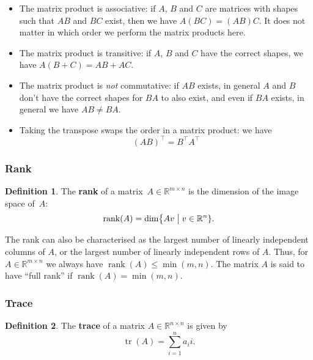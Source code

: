 \documentclass[
  a4paper,
]{article}
\theoremstyle{definition}
\newtheorem{definition}{Definition}[section]
\theoremstyle{definition}
\theoremstyle{definition}
\theoremstyle{definition}
\theoremstyle{remark}
\begin{document}
\begin{itemize}
\item
  The matrix product is associative: if \(A\), \(B\) and \(C\) are matrices
  with shapes such that \(AB\) and \(BC\) exist, then we have \(A(BC) = (AB)C\).
  It does not matter in which order we perform the matrix products here.
\item
  The matrix product is transitive: if \(A\), \(B\) and \(C\) have the
  correct shapes, we have \(A(B+C) = AB + AC\).
\item
  The matrix product is \emph{not} commutative: if \(AB\) exists, in general
  \(A\) and \(B\) don't have the correct shapes for \(BA\) to also exist,
  and even if \(BA\) exists, in general we have \(AB \neq BA\).
\item
  Taking the transpose swaps the order in a matrix product:
  we have
  \begin{equation}
    (AB)^\top = B^\top A^\top  \label{eq:AB-trans}
  \end{equation}
\end{itemize}

\hypertarget{rank}{%
\subsubsection{Rank}\label{rank}}

\begin{definition}
The \textbf{rank} of a matrix~\(A \in \mathbb{R}^{m \times n}\) is the dimension of the
image space of~\(A\):
\begin{equation*}
  \mathop{\mathrm{rank}}(A)
  = \dim \bigl\{ Av \bigm| v\in \mathbb{R}^n \}.
\end{equation*}
\end{definition}

The rank can also be characterised as the largest number of linearly
independent columns of \(A\), or the largest number of linearly
independent rows of \(A\). Thus, for \(A \in \mathbb{R}^{m \times n}\) we
always have \(\mathop{\mathrm{rank}}(A) \leq \min(m, n)\). The matrix \(A\)
is said to have ``full rank'' if \(\mathop{\mathrm{rank}}(A) = \min(m, n)\).

\hypertarget{trace}{%
\subsubsection{Trace}\label{trace}}

\begin{definition}
The \textbf{trace} of a matrix \(A \in \mathbb{R}^{n\times n}\) is given by
\begin{equation*}
  \mathop{\mathrm{tr}}(A) = \sum_{i=1}^n a_ii.
\end{equation*}
\end{definition}
\end{document}
